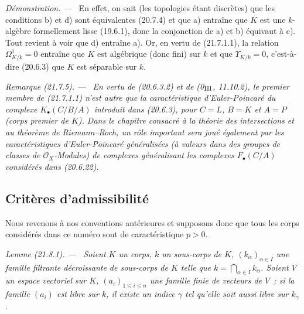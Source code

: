 \documentclass[10pt,oneside]{book}
\makeatletter
\newcommand{\setmanualcurrentlabel}[1]{\def\@currentlabel{#1}}
\newenvironment{remark}[1][]{%
  \setmanualcurrentlabel{#1}\par\medskip\noindent\itshape Remarque (#1). ---\ }{\par}
\newenvironment{lemma}[1][]{%
  \setmanualcurrentlabel{#1}\par\medskip\noindent\itshape Lemme (#1). ---\ }{\par}
\newenvironment{proof}{%
  \par\medskip\noindent\textit{Démonstration. ---\ }}{\par}
\makeatother
\begin{document}
\begin{proof}
En effet, on sait (les topologies étant discrètes) que les conditions b) et
d) sont équivalentes (20.7.4) et que a) entraîne que $K$ est une
$k$-algèbre formellement lisse (19.6.1), donc la conjonction de a) et b)
équivaut à c). Tout revient à voir que d) entraîne a). Or, en vertu de
(21.7.1.1), la relation $\Omega^1_{K/k}=0$ entraîne que $K$ est algébrique
(donc fini) sur $k$ et que $\Upsilon_{K/k}=0$, c'est-à-dire (20.6.3) que
$K$ est séparable sur $k$.
\end{proof}

\begin{remark}[21.7.5]
\label{0.21.7.5-fr}
En vertu de (20.6.3.2) et de (0$_{\rm III}$, 11.10.2), le premier membre de
(21.7.1.1) n'est autre que la \emph{caractéristique d'Euler-Poincaré} du
complexe $K_\bullet(C/B/A)$ introduit dans (20.6.3), pour $C=L$, $B=K$ et
$A=P$ (corps premier de $K$). Dans le chapitre consacré à la théorie des
intersections et au théorème de Riemann--Roch, un rôle important sera joué
également par les caractéristiques d'Euler-Poincaré généralisées (à valeurs
dans des groupes de classes de $\mathcal O_X$-Modules) de complexes
généralisant les complexes $F_\bullet(C/A)$ considérés dans (20.6.22).
\end{remark}

\subsection{Critères d'admissibilité}
\label{subsection:0.21.8-fr}

Nous revenons à nos conventions antérieures et supposons donc que tous les
corps considérés dans ce numéro sont de caractéristique $p>0$.

\begin{lemma}[21.8.1]
\label{0.21.8.1-fr}
Soient $K$ un corps, $k$ un sous-corps de $K$, $(k_\alpha)_{\alpha\in I}$ une
famille filtrante décroissante de sous-corps de $K$ telle que
$k=\bigcap_{\alpha\in I}k_\alpha$. Soient $V$ un espace vectoriel sur $K$,
$(a_i)_{1\leqslant i\leqslant n}$ une famille finie de vecteurs de $V$~; si la
famille $(a_i)$ est libre sur $k$, il existe un indice $\gamma$ tel qu'elle
soit aussi libre sur $k_\gamma$.
\end{lemma}
\end{document}
